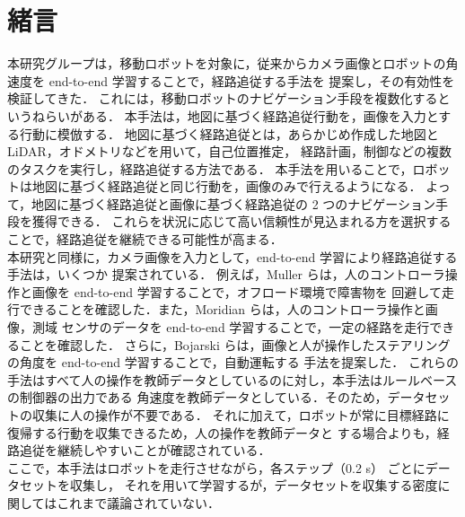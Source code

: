 \documentclass{jarticle}
\begin{document}
\date{} %

\maketitle
\thispagestyle{empty}
\pagestyle{empty}

\small
\section{緒言}
本研究グループは，移動ロボットを対象に，従来からカメラ画像とロボットの角速度を end-to-end 学習することで，経路追従する手法を
提案し，その有効性を検証してきた\cite{okada}\cite{okada2}\cite{kiyooka}．
これには，移動ロボットのナビゲーション手段を複数化するというねらいがある．
本手法は，地図に基づく経路追従行動を，画像を入力とする行動に模倣する．
地図に基づく経路追従とは，あらかじめ作成した地図と LiDAR，オドメトリなどを用いて，自己位置推定，
経路計画，制御などの複数のタスクを実行し，経路追従する方法である．
本手法を用いることで，ロボットは地図に基づく経路追従と同じ行動を，画像のみで行えるようになる．
よって，地図に基づく経路追従と画像に基づく経路追従の 2 つのナビゲーション手段を獲得できる．
これらを状況に応じて高い信頼性が見込まれる方を選択することで，経路追従を継続できる可能性が高まる．\\
\hspace*{1zw}本研究と同様に，カメラ画像を入力として，end-to-end 学習により経路追従する手法は，いくつか
提案されている．
例えば，Muller らは，人のコントローラ操作と画像を end-to-end 学習することで，オフロード環境で障害物を
回避して走行できることを確認した\cite{off_load}．また，Moridian らは，人のコントローラ操作と画像，測域
センサのデータを end-to-end 学習することで，一定の経路を走行できることを確認した\cite{Moridian}．
さらに，Bojarski らは，画像と人が操作したステアリングの角度を end-to-end 学習することで，自動運転する
手法を提案した\cite{Bojarski}．
これらの手法はすべて人の操作を教師データとしているのに対し，本手法はルールベースの制御器の出力である
角速度を教師データとしている．そのため，データセットの収集に人の操作が不要である．
それに加えて，ロボットが常に目標経路に復帰する行動を収集できるため，人の操作を教師データと
する場合よりも，経路追従を継続しやすいことが確認されている\cite{imai}．\\
\hspace*{1zw}ここで，本手法はロボットを走行させながら，各ステップ（0.2 s） ごとにデータセットを収集し，
それを用いて学習するが，データセットを収集する密度に関してはこれまで議論されていない．
\end{document}
